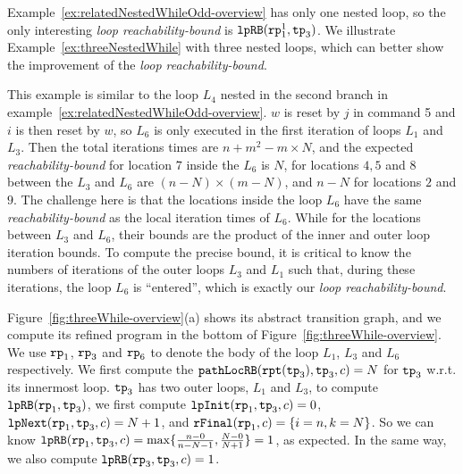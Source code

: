 Example~\ref{ex:relatedNestedWhileOdd-overview} has only one nested loop, so
the only interesting \emph{loop reachability-bound} is $\mathtt{lpRB}(\mathtt{rp}_1^1, \mathtt{tp}_3)$.
We illustrate Example~\ref{ex:threeNestedWhile} with three nested loops, which can better show the improvement of the \emph{loop reachability-bound}.
\begin{example}
 \label{ex:threeNestedWhile}

This example is similar to the loop $L_4$ nested in the second branch in example~\ref{ex:relatedNestedWhileOdd-overview}.
$w$ is reset by $j$ in command 5 and $i$ is then reset by $w$, so $L_6$ is only executed in the first iteration of loops $L_1$ and $L_3$.
Then the total iterations times are
$n + m^2 - m \times N$,
and the expected \emph{reachability-bound} for location $7$ inside the $L_6$ is $N$,
for locations $4, 5$ and $8$ between the $L_3$ and $L_6$ are $(n-N) \times (m - N)$,
and $n - N$ for locations $2$ and $9$.
The challenge here is that the locations inside the loop $L_6$ have the same
\emph{reachability-bound} as the local iteration times of $L_6$.
While for the locations between $L_3$ and $L_6$, their bounds are the product of the inner and outer loop iteration bounds.
To compute the precise bound, it is critical to know
the numbers of iterations of the outer loops $L_3$ and $L_1$ such that,
during these iterations, the loop $L_6$ is ``entered'', which is exactly our \emph{loop reachability-bound}.

Figure~\ref{fig:threeWhile-overview}(a) shows its abstract transition graph,
and we compute its refined program in the bottom of Figure~\ref{fig:threeWhile-overview}. 
We use $\mathtt{rp}_1$, $\mathtt{rp}_3$ and $\mathtt{rp}_6$ to denote the body of the loop $L_1$, $L_3$ and $L_6$ respectively.
We first compute the $\mathtt{pathLocRB}(\mathtt{rpt}(\mathtt{tp}_3), \mathtt{tp}_3, c) = N $ for $\mathtt{tp}_3$ w.r.t. its innermost loop.
$\mathtt{tp}_3$ has two outer loops, $L_1$ and $L_3$,
to compute $\mathtt{lpRB}(\mathtt{rp}_1, \mathtt{tp}_3)$,
we first compute $\mathtt{lpInit}( \mathtt{rp}_1, \mathtt{tp}_3, c) = 0$,
$\mathtt{lpNext}( \mathtt{rp}_1, \mathtt{tp}_3, c) = N + 1 $, and
$\mathtt{rFinal}(\mathtt{rp}_1, c) = \{ i = n, k = N \}$.
So we can know $\mathtt{lpRB}(\mathtt{rp}_1, \mathtt{tp}_3, c) = \max\{ \frac{n - 0}{n - N - 1}, \frac{N - 0}{N + 1}\} = 1$, as expected.
In the same way, we also compute $\mathtt{lpRB}(\mathtt{rp}_3, \mathtt{tp}_3, c) = 1$.
\end{example}

